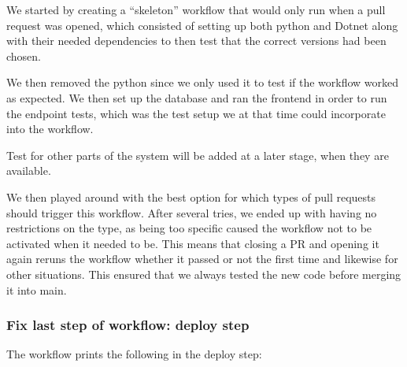 We started by creating a ``skeleton'' workflow that would only run when a pull request was opened, which consisted of setting up both python and Dotnet along with their needed dependencies to then test that the correct versions had been chosen.

We then removed the python since we only used it to test if the workflow worked as expected. We then set up the database and ran the frontend in order to run the endpoint tests, which was the test setup we at that time could incorporate into the workflow.

Test for other parts of the system will be added at a later stage, when they are available.

We then played around with the best option for which types of pull requests should trigger this workflow. After several tries, we ended up with having no restrictions on the type, as being too specific caused the workflow not to be activated when it needed to be. This means that closing a PR and opening it again reruns the workflow whether it passed or not the first time and likewise for other situations. This ensured that we always tested the new code before merging it into main.

\subsubsection{Fix last step of workflow: deploy step}
\label{log:fix-last-step-of-workflow-deploy-step}

The workflow prints the following in the deploy step:


